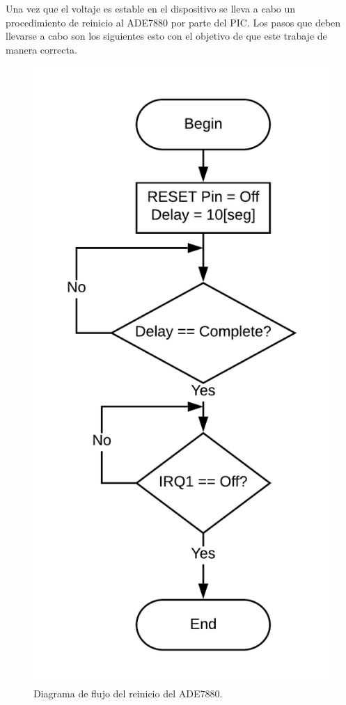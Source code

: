 \documentclass[letterpaper,12pt,oneside]{book}
\begin{document}
			Una vez que el voltaje es estable en el dispositivo se lleva a cabo un procedimiento de reinicio al ADE7880 por parte del PIC. Los pasos que deben llevarse a cabo son los siguientes esto con el objetivo de que este trabaje de manera correcta.

			\begin{figure}[!htpb]
				\centering
				\includegraphics[scale = 0.8]{Material de Consulta/Diagrama de Flujo HW Reset.PNG}
				\caption[Inicialización del ADE7880]{Diagrama de flujo del reinicio del ADE7880.}
				\label{HWRST}
			\end{figure}
\end{document}
